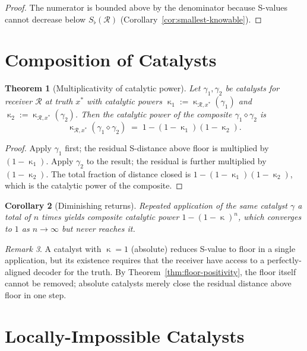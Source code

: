 \documentclass[twocolumn,11pt,a4paper]{article}
\theoremstyle{thmstyle}
\newtheorem{theorem}{Theorem}[section]
\newtheorem{corollary}[theorem]{Corollary}
\theoremstyle{thmstyle}
\theoremstyle{definition}
\theoremstyle{remark}
\newtheorem{remark}[theorem]{Remark}
\DeclareMathOperator{\catpow}{\kappa}
\newcommand{\receiver}{\mathcal{R}}
\newcommand{\Sfloor}{S_{\flat}}
\begin{document}
\begin{proof}
The numerator is bounded above by the denominator
because S-values cannot decrease below $\Sfloor(\receiver)$
(Corollary~\ref{cor:smallest-knowable}).
\end{proof}

\section{Composition of Catalysts}
\label{sec:composition-catalysts}

\begin{theorem}[Multiplicativity of catalytic power]
\label{thm:mult-cat-power}
Let $\gamma_{1}, \gamma_{2}$ be catalysts for receiver
$\receiver$ at truth $x^{*}$ with catalytic powers
$\catpow_{1} := \catpow_{\receiver, x^{*}}(\gamma_{1})$
and $\catpow_{2} := \catpow_{\receiver, x^{*}}(\gamma_{2})$.
Then the catalytic power of the composite
$\gamma_{1} \diamond \gamma_{2}$ is
\[
\catpow_{\receiver, x^{*}}(\gamma_{1} \diamond \gamma_{2})
\;=\; 1 - (1 - \catpow_{1})(1 - \catpow_{2}).
\]
\end{theorem}

\begin{proof}
Apply $\gamma_{1}$ first; the residual S-distance
above floor is multiplied by $(1 - \catpow_{1})$.
Apply $\gamma_{2}$ to the result; the residual is
further multiplied by $(1 - \catpow_{2})$.  The total
fraction of distance closed is
$1 - (1 - \catpow_{1})(1 - \catpow_{2})$, which is the
catalytic power of the composite.
\end{proof}

\begin{corollary}[Diminishing returns]\label{cor:diminishing-returns}
Repeated application of the same catalyst $\gamma$ a
total of $n$ times yields composite catalytic power
$1 - (1 - \catpow)^{n}$, which converges to
$1$ as $n \to \infty$ but never reaches it.
\end{corollary}

\begin{remark}\label{rem:perfect-catalyst}
A catalyst with $\catpow = 1$ (absolute) reduces
S-value to floor in a single application, but its
existence requires that the receiver have access to
a perfectly-aligned decoder for the truth.  By
Theorem~\ref{thm:floor-positivity}, the floor itself
cannot be removed; absolute catalysts merely close
the residual distance above floor in one step.
\end{remark}

\section{Locally-Impossible Catalysts}
\label{sec:locally-impossible}
\end{document}
